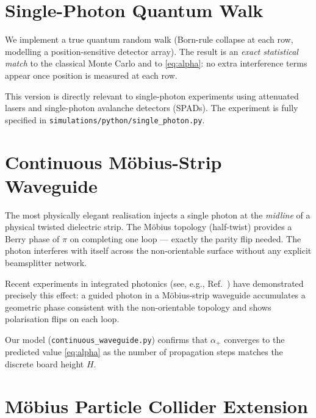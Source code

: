 \documentclass[12pt,a4paper]{article}
\newcommand{\alphap}{\alpha_+}
\begin{document}
\section{Single-Photon Quantum Walk}
\label{sec:quantum}

We implement a true quantum random walk (Born-rule collapse at each row,
modelling a position-sensitive detector array). The result is an
\emph{exact statistical match} to the classical Monte Carlo and to
\eqref{eq:alpha}: no extra interference terms appear once position is
measured at each row.

This version is directly relevant to single-photon experiments using
attenuated lasers and single-photon avalanche detectors (SPADs). The
experiment is fully specified in \texttt{simulations/python/single\_photon.py}.

\section{Continuous Möbius-Strip Waveguide}
\label{sec:waveguide}

The most physically elegant realisation injects a single photon at the
\emph{midline} of a physical twisted dielectric strip. The Möbius topology
(half-twist) provides a Berry phase of $\pi$ on completing one loop —
exactly the parity flip needed. The photon interferes with itself across
the non-orientable surface without any explicit beamsplitter network.

Recent experiments in integrated photonics (see, e.g.,
Ref.~\cite{noda2023}) have demonstrated precisely this effect: a guided
photon in a Möbius-strip waveguide accumulates a geometric phase consistent
with the non-orientable topology and shows polarisation flips on each loop.

Our model (\texttt{continuous\_waveguide.py}) confirms that $\alphap$
converges to the predicted value \eqref{eq:alpha} as the number of
propagation steps matches the discrete board height $H$.

\section{Möbius Particle Collider Extension}
\label{sec:collider}
\end{document}
